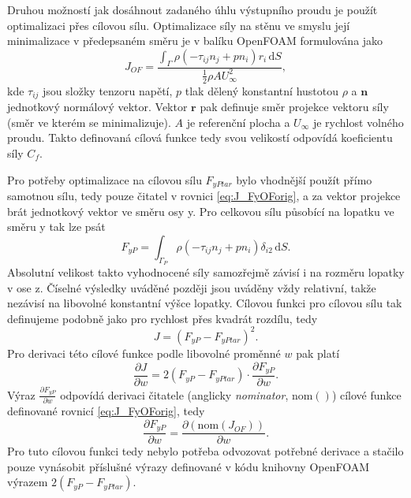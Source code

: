 Druhou možností jak dosáhnout zadaného úhlu výstupního proudu je použít optimalizaci přes cílovou sílu. 
Optimalizace síly na stěnu ve smyslu její minimalizace v předepsaném směru je v balíku OpenFOAM formulována jako
\begin{equation}\label{eq:J_FyOForig}
J_{OF}=\dfrac{\int_\Gamma \rho (-\tau_{ij}n_j+pn_i)r_i\,\mathrm{d}S}{\frac{1}{2}\rho A U_{\infty}^2},
\end{equation}
kde $ \tau_{ij} $ jsou složky tenzoru napětí, $ p $ tlak dělený konstantní hustotou $ \rho $ a $ \mathbf{n} $ jednotkový normálový vektor. Vektor $ \mathbf{r} $ pak definuje směr projekce vektoru síly (směr ve kterém se minimalizuje). $ A $ je referenční plocha a $ U_{\infty} $ je rychlost volného proudu. Takto definovaná cílová funkce tedy svou velikostí odpovídá koeficientu síly $ C_f $.

Pro potřeby optimalizace na cílovou sílu $ F_{yPtar} $ bylo vhodnější použít přímo samotnou sílu, tedy pouze čitatel v rovnici \ref{eq:J_FyOForig}, a za vektor projekce brát jednotkový vektor ve směru osy y. Pro celkovou sílu působící na lopatku ve směru y tak lze psát
\begin{equation}\label{key}
F_{yP}=\int_{\Gamma_P} \rho (-\tau_{ij}n_j+pn_i)\delta_{i2}\,\mathrm{d}S.
\end{equation}
Absolutní velikost takto vyhodnocené síly samozřejmě závisí i na rozměru lopatky v ose z. Číselné výsledky uváděné později jsou uváděny vždy relativní, takže nezávisí na libovolné konstantní výšce lopatky. Cílovou funkci pro cílovou sílu tak definujeme podobně jako pro rychlost přes kvadrát rozdílu, tedy
\begin{equation}\label{eq:J_FyTarget}
J= (F_{yP} - F_{yPtar})^2.
\end{equation}
Pro derivaci této cílové funkce podle libovolné proměnné $ w $ pak platí
\begin{equation}\label{key}
\dfrac{\partial J}{\partial w} = 
2(F_{yP}-F_{yPtar}) \cdot \dfrac{\partial F_{yP}}{\partial w}.
\end{equation}
Výraz $ \frac{\partial F_{yP}}{\partial w} $ odpovídá derivaci čitatele (anglicky \textit{nominator}, $ \mathrm{nom()} $) cílové funkce definované rovnicí \ref{eq:J_FyOForig}, tedy
\begin{equation}\label{key}
\dfrac{\partial F_{yP}}{\partial w} = \dfrac{\partial (\mathrm{nom}(J_{OF}))}{\partial w}.
\end{equation}
Pro tuto cílovou funkci tedy nebylo potřeba odvozovat potřebné derivace a stačilo pouze vynásobit příslušné výrazy definované v kódu knihovny OpenFOAM výrazem $ 2(F_{yP}-F_{yPtar}) $.



